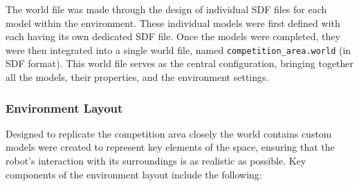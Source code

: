 \documentclass[../../main]{subfiles}
\begin{document}
The world file was made through the design of 
individual SDF files for each model within the environment. These individual 
models were first defined with each having its own dedicated 
SDF file. Once the models were completed, they were then integrated into a 
single world file, named \texttt{competition\_area.world} (in SDF format). 
This world file serves as the central configuration, bringing together all 
the models, their properties, and the environment settings.
\subsubsection{Environment Layout}  

Designed to replicate the competition area closely the world contains custom models were created to represent key elements of the space,
ensuring that the robot's interaction with its surroundings is as realistic as possible. Key components of the environment layout include the following:
\end{document}
